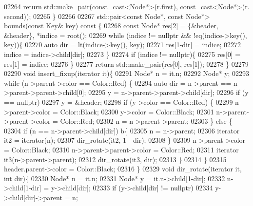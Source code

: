 \begin{DoxyCode}
02264         \textcolor{keywordflow}{return} std::make\_pair(const\_cast<Node*>(r.first), const\_cast<Node*>(r.
      second));
02265     \}
02266 
02267     std::pair<const Node*, const Node*> bounds(\textcolor{keyword}{const} Key& key)\textcolor{keyword}{ const }\{
02268         \textcolor{keyword}{const} Node* res[2] = \{&header, &header\}, *indice = root();
02269         \textcolor{keywordflow}{while} (indice != \textcolor{keyword}{nullptr} && !eq(indice->key(), key))\{
02270             \textcolor{keyword}{auto} dir = lt(indice->key(), key);
02271             res[1-dir] = indice;
02272             indice = indice->child[dir];
02273         \}
02274         \textcolor{keywordflow}{if} (indice != \textcolor{keyword}{nullptr})\{
02275             res[0] = res[1] = indice;
02276         \}
02277         \textcolor{keywordflow}{return} std::make\_pair(res[0], res[1]);
02278     \}
02279 
02290     \textcolor{keywordtype}{void} insert\_fixup(iterator it)\{
02291         Node* n = it.n;
02292         Node* y;
02293         \textcolor{keywordflow}{while} (n->parent->color == Color::Red) \{
02294             \textcolor{keyword}{auto} dir = n->parent == n->parent->parent->child[0];
02295             y = n->parent->parent->child[dir];
02296             \textcolor{keywordflow}{if} (y == \textcolor{keyword}{nullptr})
02297                 y = &header;
02298             \textcolor{keywordflow}{if} (y->color == Color::Red) \{
02299                 n->parent->color = Color::Black;
02300                 y->color = Color::Black;
02301                 n->parent->parent->color = Color::Red;
02302                 n = n->parent->parent;
02303             \} \textcolor{keywordflow}{else} \{
02304                 \textcolor{keywordflow}{if} (n == n->parent->child[dir])  b\{
02305                     n = n->parent;
02306                     iterator it2 = iterator(n);
02307                     dir\_rotate(it2, 1 - dir);
02308                 \}
02309                 n->parent->color = Color::Black;
02310                 n->parent->parent->color = Color::Red;
02311                 iterator it3(n->parent->parent);
02312                 dir\_rotate(it3, dir);
02313             \}
02314         \}
02315         header.parent->color = Color::Black;
02316     \}
02329     \textcolor{keywordtype}{void} dir\_rotate(iterator it, \textcolor{keywordtype}{int} dir)\{
02330         Node* n = it.n;
02331         Node* y = it.n->child[1-dir];
02332         n->child[1-dir] = y->child[dir];
02333         \textcolor{keywordflow}{if} (y->child[dir] != \textcolor{keyword}{nullptr})
02334             y->child[dir]->parent = n;

\end{DoxyCode}
